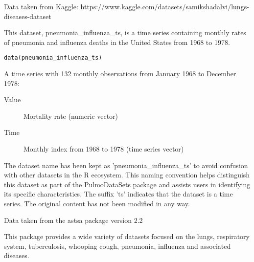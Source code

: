 \documentclass[a4paper]{book}
\begin{document}
%
\begin{Source}
Data taken from Kaggle: https://www.kaggle.com/datasets/samikshadalvi/lungs-diseases-dataset
\end{Source}
%
\begin{Description}
This dataset, pneumonia\_influenza\_ts, is a time series containing monthly rates
of pneumonia and influenza deaths in the United States from 1968 to 1978.
\end{Description}
%
\begin{Usage}
\begin{verbatim}
data(pneumonia_influenza_ts)
\end{verbatim}
\end{Usage}
%
\begin{Format}
A time series with 132 monthly observations from January 1968 to December 1978:
\begin{description}

\item[Value] Mortality rate (numeric vector)
\item[Time] Monthly index from 1968 to 1978 (time series vector)

\end{description}

\end{Format}
%
\begin{Details}
The dataset name has been kept as 'pneumonia\_influenza\_ts' to avoid confusion with other datasets
in the R ecosystem. This naming convention helps distinguish this dataset as part of the
PulmoDataSets package and assists users in identifying its specific characteristics.
The suffix 'ts' indicates that the dataset is a time series. The original content has not been modified
in any way.
\end{Details}
%
\begin{Source}
Data taken from the astsa package version 2.2
\end{Source}
%
\begin{Description}

This package provides a wide variety of datasets focused on the lungs, respiratory system, tuberculosis, whooping cough, pneumonia, influenza and associated diseases.

\end{Description}
\end{document}

